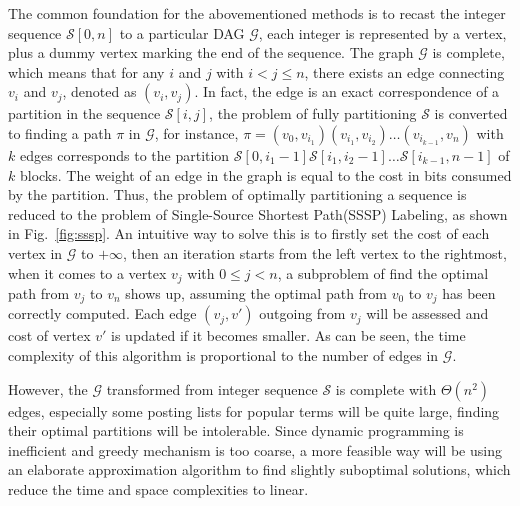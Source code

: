 \documentclass[runningheads,a4paper]{llncs}
\begin{document}
The common foundation for the abovementioned methods is to recast the integer sequence $\mathcal{S} \left[ 0,n \right]$ to a particular DAG $\mathcal{G}$, each integer is represented by a vertex, plus a dummy vertex marking the end of the sequence.
The graph $\mathcal{G}$ is complete, which means that for any $i$ and $j$ with $i < j \leqslant n$, there exists an edge connecting $v_{i}$ and $v_{j}$, denoted as $\left( v_{i}, v_{j} \right)$.
In fact, the edge is an exact correspondence of a partition in the sequence $\mathcal{S}\left[i,j \right] $, the problem of fully partitioning $\mathcal{S}$ is converted to finding a path $\pi$ in $\mathcal{G}$, for instance, $\pi=\left( v_{0}, v_{i_{1}} \right) \left( v_{i_{1}}, v_{i_{2}} \right)\ldots\left( v_{i_{k-1}}, v_{n} \right)$ with $k$ edges corresponds to the partition $\mathcal{S}\left[0,i_{1}-1 \right]\mathcal{S}\left[i_{1},i_{2}-1 \right] \ldots\mathcal{S}\left[i_{k-1},n-1\right] $ of $k$ blocks.
The weight of an edge in the graph is equal to the cost in bits consumed by the partition. Thus, the problem of optimally partitioning a sequence is reduced to the problem of Single-Source Shortest Path(SSSP) Labeling, as shown in Fig.~\ref{fig:sssp}.
An intuitive way to solve this is to firstly set the cost of each vertex in $\mathcal{G}$ to $+\infty$, then an iteration starts from the left vertex to the rightmost, when it comes to a vertex $v_{j}$ with $0\leqslant j < n$, a subproblem of find the optimal path from $v_{j}$ to $v_{n}$ shows up, assuming the optimal path from $v_{0}$ to $v_{j}$ has been correctly computed.
Each edge $\left( v_{j},v'\right)$ outgoing from $v_{j}$ will be assessed and cost of vertex $v'$ is updated if it becomes smaller. As can be seen, the time complexity of this algorithm is proportional to the number of edges in $\mathcal{G}$.

However, the $\mathcal{G}$ transformed from integer sequence $\mathcal{S}$ is complete with $\Theta\left( n^{2}\right)$ edges, especially some posting lists for popular terms will be quite large, finding their optimal partitions will be intolerable.
Since dynamic programming is inefficient and greedy mechanism is too coarse, a more feasible way will be using an elaborate approximation algorithm to find slightly suboptimal solutions, which reduce the time and space complexities to linear.
\end{document}
